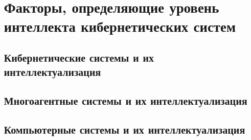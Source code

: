 \chapter{Факторы, определяющие уровень интеллекта кибернетических систем}
\label{chapter_intro}


\section{Кибернетические системы и их интеллектуализация}
\section{Многоагентные системы и их интеллектуализация}
\section{Компьютерные системы и их интеллектуализация}

%